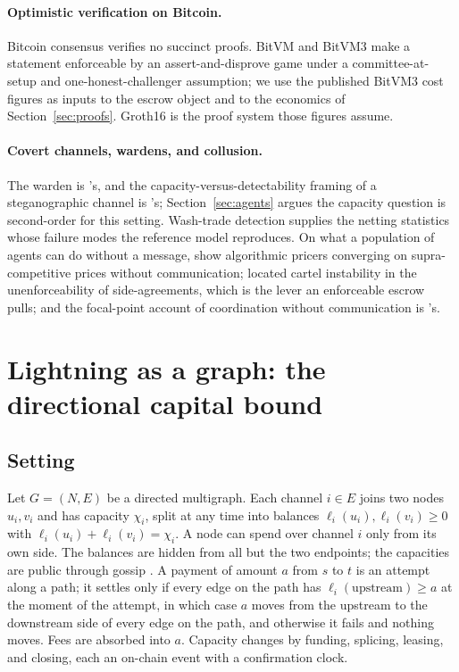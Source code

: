 \documentclass[11pt]{article}
\theoremstyle{plain}
\theoremstyle{definition}
\theoremstyle{remark}
\begin{document}
\paragraph{Optimistic verification on Bitcoin.} Bitcoin consensus verifies no succinct proofs. BitVM \citep{linus2023bitvm,linus2024bitvm2} and BitVM3 \citep{linus2026bitvm3} make a statement enforceable by an assert-and-disprove game under a committee-at-setup and one-honest-challenger assumption; we use the published BitVM3 cost figures as inputs to the escrow object and to the economics of Section~\ref{sec:proofs}. Groth16 \citep{groth2016size} is the proof system those figures assume.

\paragraph{Covert channels, wardens, and collusion.} The warden is \citet{simmons1984prisoners}'s, and the capacity-versus-detectability framing of a steganographic channel is \citet{cachin1998information}'s; Section~\ref{sec:agents} argues the capacity question is second-order for this setting. Wash-trade detection \citep{cong2023wash,victor2021wash} supplies the netting statistics whose failure modes the reference model reproduces. On what a population of agents can do without a message, \citet{calvano2020ai} show algorithmic pricers converging on supra-competitive prices without communication; \citet{stigler1964oligopoly} located cartel instability in the unenforceability of side-agreements, which is the lever an enforceable escrow pulls; and the focal-point account of coordination without communication is \citet{schelling1960strategy}'s.

\section{Lightning as a graph: the directional capital bound}
\label{sec:lightning}

\subsection{Setting}

Let $G=(N,E)$ be a directed multigraph. Each channel $i\in E$ joins two nodes $u_i,v_i$ and has capacity $\chi_i$, split at any time into balances $\ell_i(u_i),\ell_i(v_i)\ge 0$ with $\ell_i(u_i)+\ell_i(v_i)=\chi_i$. A node can spend over channel $i$ only from its own side. The balances are hidden from all but the two endpoints; the capacities are public through gossip \citep{bolt7}. A payment of amount $a$ from $s$ to $t$ is an attempt along a path; it settles only if every edge on the path has $\ell_i(\text{upstream})\ge a$ at the moment of the attempt, in which case $a$ moves from the upstream to the downstream side of every edge on the path, and otherwise it fails and nothing moves. Fees are absorbed into $a$. Capacity changes by funding, splicing, leasing, and closing, each an on-chain event with a confirmation clock.
\end{document}
